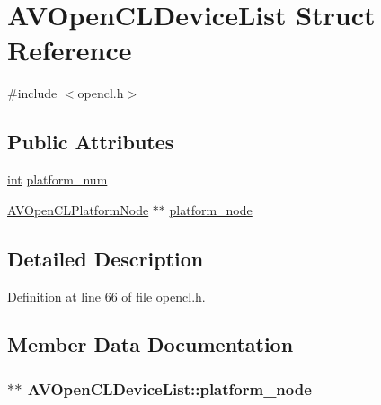 \hypertarget{struct_a_v_open_c_l_device_list}{}\section{A\+V\+Open\+C\+L\+Device\+List Struct Reference}
\label{struct_a_v_open_c_l_device_list}


{\ttfamily \#include $<$opencl.\+h$>$}

\subsection*{Public Attributes}
\begin{DoxyCompactItemize}
\item 
\hyperlink{xmltok_8h_a5a0d4a5641ce434f1d23533f2b2e6653}{int} \hyperlink{struct_a_v_open_c_l_device_list_a4149c9c19e5171d69005d8cf0605f800}{platform\+\_\+num}
\item 
\hyperlink{struct_a_v_open_c_l_platform_node}{A\+V\+Open\+C\+L\+Platform\+Node} $\ast$$\ast$ \hyperlink{struct_a_v_open_c_l_device_list_ac355454d2cc271bb5bd209324b0f84dc}{platform\+\_\+node}
\end{DoxyCompactItemize}


\subsection{Detailed Description}


Definition at line 66 of file opencl.\+h.



\subsection{Member Data Documentation}
\subsubsection[{\texorpdfstring{platform\+\_\+node}{platform_node}}]{$\ast$$\ast$ A\+V\+Open\+C\+L\+Device\+List\+::platform\+\_\+node}\hypertarget{struct_a_v_open_c_l_device_list_ac355454d2cc271bb5bd209324b0f84dc}{}\label{struct_a_v_open_c_l_device_list_ac355454d2cc271bb5bd209324b0f84dc}


